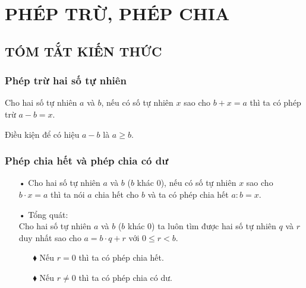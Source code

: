 \section{PHÉP TRỪ, PHÉP CHIA}
\subsection{TÓM TẮT KIẾN THỨC}
\begin{tomtat}
	\subsubsection{Phép trừ hai số tự nhiên}
Cho hai số tự nhiên $a$ và $b$, nếu có số tự nhiên $x$ sao cho $b + x = a$ thì ta có phép trừ $a - b = x$.\\
\begin{note}
	 Điều kiện để có hiệu $a - b$ là $a \geq b$. 
\end{note}

	\subsubsection{Phép chia hết và phép chia có dư}
\begin{itemize}
\item[•] Cho hai số tự nhiên $a$ và $b$ ($b$ khác $0$), nếu có số tự nhiên $x$ sao cho $b \cdot x = a$ thì ta nói $a$ chia hết cho $b$ và ta có phép chia hết $a : b = x$.
\item[•] Tổng quát: \\
Cho hai số tự nhiên $a$ và $b$ ($b$ khác $0$) ta luôn tìm được hai số tự nhiên $q$ và $r$ duy nhất sao cho $a = b \cdot q + r$ với $0 \le r < b$.
\begin{itemize}
\item[$\blacklozenge$] Nếu $r = 0$ thì ta có phép chia hết.
\item[$\blacklozenge$] Nếu $r \neq 0$ thì ta có phép chia có dư. 
\end{itemize}
\end{itemize}
\end{tomtat}

